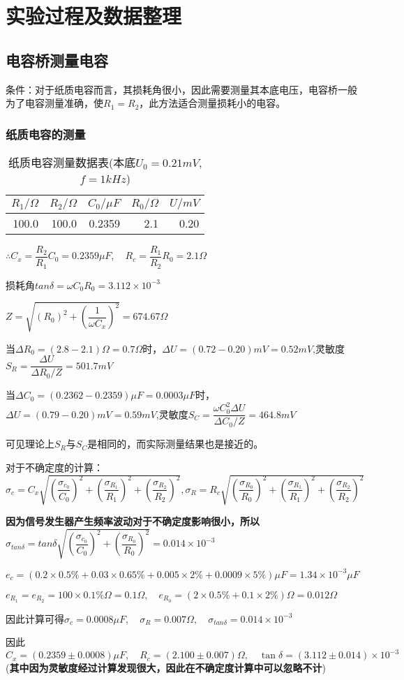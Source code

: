 \documentclass[UTF8]{ctexart}
\begin{document}
	\section{实验过程及数据整理}
	\subsection{电容桥测量电容}
	条件：对于纸质电容而言，其损耗角很小，因此需要测量其本底电压，电容桥一般为了电容测量准确，使$R_{1}=R_{2}$，此方法适合测量损耗小的电容。
	\subsubsection{纸质电容的测量}
	\begin{table}[H]
		\centering
		\caption{纸质电容测量数据表(本底$U_{0}=0.21mV$,$f=1kHz$)}
		\label{纸质电容测量数据表}
		\begin{tabular}{|r|r|r|r|r|}
			\toprule[0.5mm]
			$R_{1}/\Omega$&$R_{2}/\Omega$&$C_{0}/\mu F$&$R_{0}/\Omega$&$U/mV$\\
			\midrule
			100.0&100.0&0.2359&2.1&0.20\\
			\bottomrule[0.5mm]
		\end{tabular}
	\end{table}
	$\therefore C_{x}=\dfrac{R_{2}}{R_{1}}C_{0}=0.2359\mu F,\quad R_{c}=\dfrac{R_{1}}{R_{2}}R_{0}=2.1\Omega$
	\par 损耗角$tan\delta=\omega C_{0}R_{0}=3.112\times 10^{-3}$
	\par $Z=\sqrt{(R_{0})^{2}+(\dfrac{1}{\omega C_{x}})^{2}}=674.67\Omega$
	\par 当$\Delta R_{0}=(2.8-2.1)\Omega=0.7\Omega$时，$\Delta U=(0.72-0.20)mV=0.52mV$,灵敏度$S_{R}=\dfrac{\Delta U}{\Delta R_{0}/Z}=501.7mV$
	\par 当$\Delta C_{0}=(0.2362-0.2359)\mu F=0.0003\mu F$时，$\Delta U=(0.79-0.20)mV=0.59mV$,灵敏度$S_{C}=\dfrac{\omega C_{0}^{2}\Delta U}{\Delta C_{0}/Z}=464.8mV$
	\par 可见理论上$S_{R}$与$S_{C}$是相同的，而实际测量结果也是接近的。
	\par 对于不确定度的计算：$\sigma_{c}=C_{x}\sqrt{(\dfrac{\sigma_{c_{0}}}{C_{0}})^{2}+(\dfrac{\sigma_{R_{1}}}{R_{1}})^{2}+(\dfrac{\sigma_{R_{2}}}{R_{2}})^{2}},\sigma_{R}=R_{c}\sqrt{(\dfrac{\sigma_{R_{0}}}{R_{0}})^{2}+(\dfrac{\sigma_{R_{1}}}{R_{1}})^{2}+(\dfrac{\sigma_{R_{2}}}{R_{2}})^{2}}$
	\par \textbf{因为信号发生器产生频率波动对于不确定度影响很小，所以}$\sigma_{tan\delta}=tan\delta\sqrt{(\dfrac{\sigma_{c_{0}}}{C_{0}})^{2}+(\dfrac{\sigma_{R_{0}}}{R_{0}})^{2}}=0.014\times10^{-3}$
	\par $e_{c}=(0.2\times 0.5\%+0.03\times0.65\%+0.005\times2\%+0.0009\times5\%)\mu F=1.34\times10^{-3}\mu F$
	\par $e_{R_{1}}=e_{R_{2}}=100\times0.1\%\Omega=0.1\Omega,\quad e_{R_{0}}=(2\times0.5\%+0.1\times2\%)\Omega=0.012\Omega$
	\par 因此计算可得$\sigma_{c}=0.0008\mu F,\quad\sigma_{R}=0.007\Omega,\quad\sigma_{tan\delta}=0.014\times10^{-3}$
	\par 因此$C_{x}=(0.2359\pm 0.0008)\mu F,\quad R_{c}=(2.100\pm 0.007)\Omega,\quad\tan\delta=(3.112\pm 0.014)\times10^{-3}$(\textbf{其中因为灵敏度经过计算发现很大，因此在不确定度计算中可以忽略不计})
\end{document}
